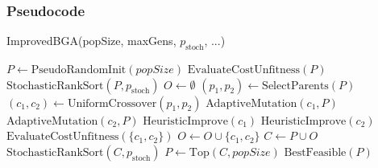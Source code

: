 \documentclass[12pt]{article}
\begin{document}
\subsubsection{Pseudocode}
\begin{algorithm}[htbp]
\caption{ImprovedBGA(popSize, maxGens, \(p_{\mathrm{stoch}}\), ...)}
\begin{algorithmic}[1]
  \State \(P \gets \text{PseudoRandomInit}(popSize)\)
  \State \(\text{EvaluateCostUnfitness}(P)\)
    \State \(\text{StochasticRankSort}(P, p_{\mathrm{stoch}})\)
    \State \(O \gets \emptyset\)
      \State \((p_1, p_2) \gets \text{SelectParents}(P)\)
      \State \((c_1, c_2) \gets \text{UniformCrossover}(p_1, p_2)\)
      \State \(\text{AdaptiveMutation}(c_1, P)\)
      \State \(\text{AdaptiveMutation}(c_2, P)\)
      \State \(\text{HeuristicImprove}(c_1)\)
      \State \(\text{HeuristicImprove}(c_2)\)
      \State \(\text{EvaluateCostUnfitness}(\{c_1, c_2\})\)
      \State \(O \gets O \cup \{c_1, c_2\}\)
    \EndWhile
    \State \(C \gets P \cup O\)
    \State \(\text{StochasticRankSort}(C, p_{\mathrm{stoch}})\)
    \State \(P \gets \text{Top}(C, popSize)\)
  \EndFor
  \State \Return \(\text{BestFeasible}(P)\)
\end{algorithmic}
\end{algorithm}
\end{document}
